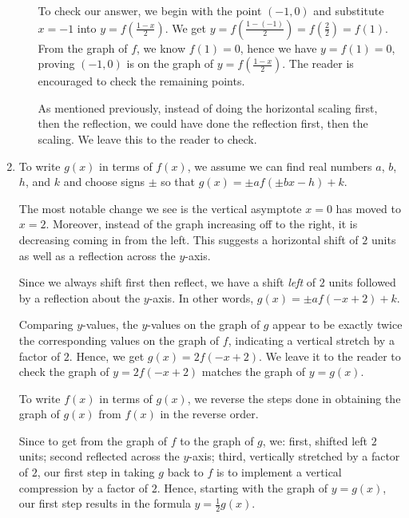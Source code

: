 \begin{ex}
\begin{enumerate}
\begin{enumerate}
\begin{mfigure}
\begin{graphtrans}
\end{graphtrans}
\caption{}
\label{fig:yeqfxplushalftoyeqfplushalfxetc}
\end{mfigure}

To check our answer, we begin with the point $(-1,0)$ and substitute $x=-1$ into $y = f\left( \frac{1-x}{2} \right)$.  We get $y = f\left( \frac{1-(-1)}{2} \right) = f\left( \frac{2}{2} \right) = f(1)$.  From the graph of $f$, we know $f(1) = 0$, hence we have $y = f(1) = 0$, proving $(-1,0)$ is on the graph of $y = f\left( \frac{1-x}{2}\right)$.  The reader is encouraged to check the remaining points.

As mentioned previously, instead of doing the horizontal scaling first, then the reflection, we could have done the reflection first, then the scaling.  We leave this to the reader to check.

 \end{enumerate}
 
 \item To write $g(x)$ in terms of $f(x)$, we assume we can find real numbers $a$, $b$, $h$, and $k$ and choose signs $\pm$ so that $g(x) = \pm a f(\pm b x - h)+k$.   
 
 The most notable change we see is the vertical asymptote $x=0$ has moved to $x=2$.  Moreover, instead of the graph increasing off to the right, it is decreasing coming in from the left.  This suggests a horizontal shift of $2$ units as well as a reflection across the $y$-axis.  
 
 Since we always shift first then reflect, we have a shift \textit{left} of $2$ units followed by a reflection about the $y$-axis.  In other words, $g(x) = \pm a f(-x+2) + k$.  
 
 Comparing $y$-values, the $y$-values on the graph of $g$ appear to be exactly twice the corresponding values on the graph of $f$, indicating a vertical stretch by a factor of $2$.  Hence, we get $g(x) = 2 f(-x+2)$.  We leave it to the reader to check the graph of $y=2f(-x+2)$ matches the graph of $y=g(x)$.  
 
To write $f(x)$ in terms of $g(x)$, we reverse the steps done in obtaining the graph of $g(x)$ from $f(x)$ in the reverse order.  

Since to get from the graph of $f$ to the graph of $g$, we: first, shifted left $2$ units; second reflected across the $y$-axis; third, vertically stretched by a factor of $2$, our first step in taking $g$ back to $f$ is to implement a vertical compression by a factor of $2$.  Hence, starting with the graph of $y=g(x)$, our first step results in the formula $y = \frac{1}{2} g(x)$. 


\end{enumerate}
\end{ex}
